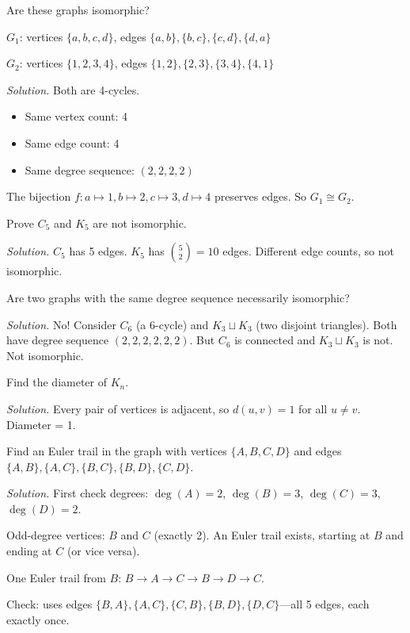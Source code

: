 \begin{example}
Are these graphs isomorphic?

$G_1$: vertices $\{a, b, c, d\}$, edges $\{a,b\}, \{b,c\}, \{c,d\}, \{d,a\}$

$G_2$: vertices $\{1, 2, 3, 4\}$, edges $\{1,2\}, \{2,3\}, \{3,4\}, \{4,1\}$

\emph{Solution.} Both are 4-cycles.
\begin{itemize}
  \item Same vertex count: 4 \checkmark
  \item Same edge count: 4 \checkmark
  \item Same degree sequence: $(2, 2, 2, 2)$ \checkmark
\end{itemize}

The bijection $f: a \mapsto 1, b \mapsto 2, c \mapsto 3, d \mapsto 4$ preserves edges. So $G_1 \cong G_2$.
\end{example}

\begin{example}
Prove $C_5$ and $K_5$ are not isomorphic.

\emph{Solution.} $C_5$ has 5 edges. $K_5$ has $\binom{5}{2} = 10$ edges. Different edge counts, so not isomorphic.
\end{example}

\begin{example}
Are two graphs with the same degree sequence necessarily isomorphic?

\emph{Solution.} No! Consider $C_6$ (a 6-cycle) and $K_3 \sqcup K_3$ (two disjoint triangles). Both have degree sequence $(2, 2, 2, 2, 2, 2)$. But $C_6$ is connected and $K_3 \sqcup K_3$ is not. Not isomorphic.
\end{example}

\begin{example}
Find the diameter of $K_n$.

\emph{Solution.} Every pair of vertices is adjacent, so $d(u, v) = 1$ for all $u \neq v$. Diameter = 1.
\end{example}

\begin{example}
Find an Euler trail in the graph with vertices $\{A, B, C, D\}$ and edges $\{A,B\}, \{A,C\}, \{B,C\}, \{B,D\}, \{C,D\}$.

\emph{Solution.} First check degrees: $\deg(A) = 2$, $\deg(B) = 3$, $\deg(C) = 3$, $\deg(D) = 2$.

Odd-degree vertices: $B$ and $C$ (exactly 2). An Euler trail exists, starting at $B$ and ending at $C$ (or vice versa).

One Euler trail from $B$: $B \to A \to C \to B \to D \to C$.

Check: uses edges $\{B,A\}, \{A,C\}, \{C,B\}, \{B,D\}, \{D,C\}$---all 5 edges, each exactly once. \checkmark
\end{example}

